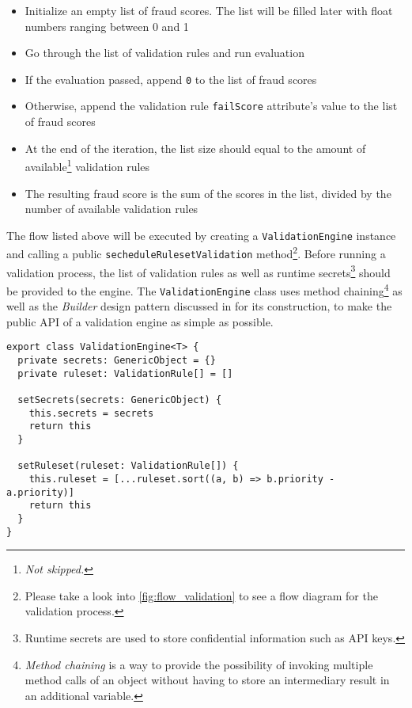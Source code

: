       \begin{itemize}
        \item Initialize an empty list of fraud scores. The list will be filled later with float numbers ranging between 0 and 1
        \item Go through the list of validation rules and run evaluation
        \item If the evaluation passed, append \verb;0; to the list of fraud scores
        \item Otherwise, append the validation rule \verb;failScore; attribute's value to the list of fraud scores
        \item At the end of the iteration, the list size should equal to the amount of available\footnote{\emph{Not skipped.}} validation rules
        \item The resulting fraud score is the sum of the scores in the list, divided by the number of available validation rules
      \end{itemize}
      
      The flow listed above will be executed by creating a \verb;ValidationEngine; instance and calling a public \verb;secheduleRulesetValidation; method\footnote{Please take a look into \autoref{fig:flow_validation} to see a flow diagram for the validation process.}. Before running a validation process, the list of validation rules as well as runtime secrets\footnote{Runtime secrets are used to store confidential information such as API keys.} should be provided to the engine. The \verb;ValidationEngine; class uses method chaining\footnote{\emph{Method chaining} is a way to provide the possibility of invoking multiple method calls of an object without having to store an intermediary result in an additional variable.} as well as the \emph{Builder} design pattern discussed in \autocite[pp. 97-106]{gamma-1995} for its construction, to make the public API of a validation engine as simple as possible.

      \newpage
      \begin{lstlisting}[style=es6, caption={ValidationEngine class builder pattern using method chaining (TypeScript)}]
export class ValidationEngine<T> {
  private secrets: GenericObject = {}
  private ruleset: ValidationRule[] = []

  setSecrets(secrets: GenericObject) {
    this.secrets = secrets
    return this
  }

  setRuleset(ruleset: ValidationRule[]) {
    this.ruleset = [...ruleset.sort((a, b) => b.priority - a.priority)]
    return this
  }
}
      \end{lstlisting}

